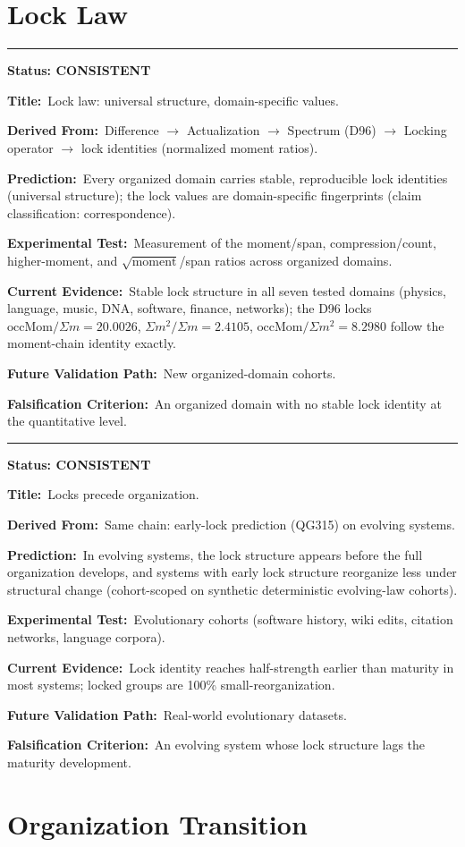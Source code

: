 \documentclass[11pt,a4paper]{article}
\newcommand{\predstart}[2]{%
  \par\medskip\noindent\hrule\par\smallskip
  \noindent{\large\bfseries #1}\hfill{\bfseries Status: #2}\par\smallskip
}
\newcommand{\pfield}[2]{%
  \noindent\textbf{#1:}~#2\par\smallskip
}
\begin{document}
\section{Lock Law}
\label{sec:lock-law}

\predstart{AT-P035}{CONSISTENT}
\pfield{Title}{Lock law: universal structure, domain-specific values.}
\pfield{Derived From}{Difference $\to$ Actualization $\to$ Spectrum (D96) $\to$ Locking
operator $\to$ lock identities (normalized moment ratios).}
\pfield{Prediction}{Every organized domain carries stable, reproducible lock identities
(universal structure); the lock values are domain-specific fingerprints (claim
classification: correspondence).}
\pfield{Experimental Test}{Measurement of the moment/span, compression/count,
higher-moment, and $\sqrt{\text{moment}}$/span ratios across organized domains.}
\pfield{Current Evidence}{Stable lock structure in all seven tested domains (physics,
language, music, DNA, software, finance, networks); the D96 locks
$\mathrm{occMom}/\Sigma m = 20.0026$, $\Sigma m^2/\Sigma m = 2.4105$,
$\mathrm{occMom}/\Sigma m^2 = 8.2980$ follow the moment-chain identity exactly.}
\pfield{Future Validation Path}{New organized-domain cohorts.}
\pfield{Falsification Criterion}{An organized domain with no stable lock identity at the
quantitative level.}

\predstart{AT-P036}{CONSISTENT}
\pfield{Title}{Locks precede organization.}
\pfield{Derived From}{Same chain: early-lock prediction (QG315) on evolving systems.}
\pfield{Prediction}{In evolving systems, the lock structure appears before the full
organization develops, and systems with early lock structure reorganize less under
structural change (cohort-scoped on synthetic deterministic evolving-law cohorts).}
\pfield{Experimental Test}{Evolutionary cohorts (software history, wiki edits, citation
networks, language corpora).}
\pfield{Current Evidence}{Lock identity reaches half-strength earlier than maturity in most
systems; locked groups are 100\% small-reorganization.}
\pfield{Future Validation Path}{Real-world evolutionary datasets.}
\pfield{Falsification Criterion}{An evolving system whose lock structure lags the maturity
development.}

\section{Organization Transition}
\label{sec:transition}
\end{document}
